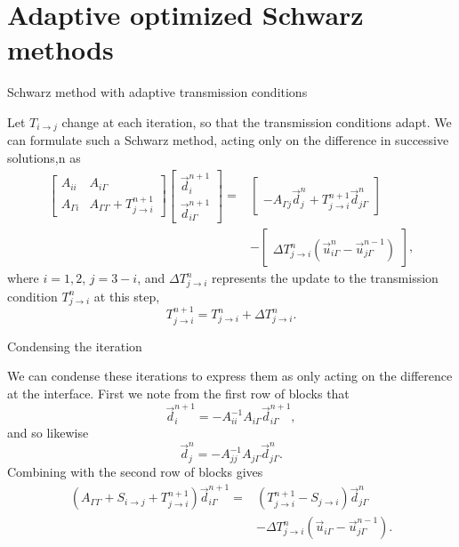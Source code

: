 \documentclass{beamer}
\begin{document}

\section{Adaptive optimized Schwarz methods} %

\begin{frame}{Schwarz method with adaptive transmission conditions}

Let $T_{i \to j}$ change at each iteration, so that the transmission conditions adapt.
We can formulate such a Schwarz method, acting only on the difference in successive solutions,n as
\begin{align*}
	\begin{bmatrix} A_{ii} & A_{i \Gamma} \\ A_{\Gamma i} & A_{\Gamma \Gamma} + T_{j \to i}^{n+1} \end{bmatrix}
	\begin{bmatrix} \vec{d}_i^{n+1} \\ \vec{d}_{i \Gamma}^{n+1} \end{bmatrix}
	= & \begin{bmatrix} ~ \\ -A_{\Gamma j} \vec{d}_j^n + T_{j \to i}^{n+1} \vec{d}_{j \Gamma}^n \end{bmatrix} \\
	& - \begin{bmatrix} ~ \\ \Delta T_{j \to i}^n \left ( \vec{u}_{i \Gamma}^n - \vec{u}_{j \Gamma}^{n-1} \right ) \end{bmatrix},
\end{align*}
where $i=1,2$, $j=3-i$, and $\Delta T_{j \to i}^n$ represents the update to the transmission condition $T_{j \to i}^n$ at this step,
\begin{equation*}
	T_{j \to i}^{n+1} = T_{j \to i}^n + \Delta T_{j \to i}^n.
\end{equation*}
\end{frame}

\begin{frame}{Condensing the iteration}

We can condense these iterations to express them as only acting on the difference at the interface.
First we note from the first row of blocks that
\begin{equation*}
	\vec{d}_i^{n+1} = -A_{ii}^{-1} A_{i \Gamma} \vec{d}_{i \Gamma}^{n+1},
\end{equation*}
and so likewise
\begin{equation*}
	\vec{d}_j^{n} = -A_{jj}^{-1} A_{j \Gamma} \vec{d}_{j \Gamma}^{n}.
\end{equation*}
Combining with the second row of blocks gives
\begin{align*}
	\left ( A_{\Gamma \Gamma} + S_{i \to j} + T_{j \to i}^{n+1} \right ) \vec{d}_{i \Gamma}^{n+1} =
	& \left ( T_{j \to i}^{n+1} - S_{j \to i} \right ) \vec{d}_{j \Gamma}^n \\
	& - \Delta T_{j \to i}^n \left ( \vec{u}_{i \Gamma} - \vec{u}_{j \Gamma}^{n-1} \right ).
\end{align*}
\end{frame}
\end{document}
